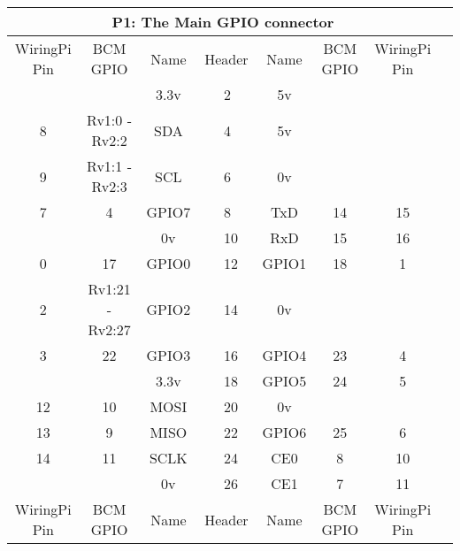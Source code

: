 \documentclass[12pt,a4paper]{article}
\begin{document}
\begin{sffamily}
\begin{center}
\begin{tabular}{|c|c|c||p{8mm}|p{8mm}||c|c|c|c|}
\hline
\multicolumn{8}{|c|}{\bfseries{P1: The Main GPIO connector}}\\
\hline
\hline
WiringPi Pin	& BCM GPIO	& Name	& \multicolumn{2}{|c||}{Header}	& Name	& BCM GPIO	& WiringPi Pin\\
\hline
\hline
	& 			& \textcolor{rtb-red}{3.3v}	& \raggedleft{1} &  2 & \textcolor{rtb-maroon}{5v}	& 	& \\
\hline
8	& Rv1:0 - Rv2:2		& \textcolor{rtb-aqua}{SDA}	& \raggedleft{3} &  4 & \textcolor{rtb-maroon}{5v}	& 	& \\
\hline
9	& Rv1:1 - Rv2:3		& \textcolor{rtb-aqua}{SCL}	& \raggedleft{5} &  6 & \textcolor{rtb-black}{0v}	& 	& \\
\hline
7	& 4			& \textcolor{rtb-green}{GPIO7}	& \raggedleft{7} &  8 & \textcolor{rtb-yellow}{TxD}	& 14    & 15\\
\hline
	& 			& \textcolor{rtb-black}{0v}	& \raggedleft{9} & 10 & \textcolor{rtb-yellow}{RxD}	& 15	& 16\\
\hline
0	& 17			& \textcolor{rtb-green}{GPIO0}	& \raggedleft{11} & 12 & \textcolor{rtb-green}{GPIO1}	& 18	& 1\\
\hline
2	& Rv1:21 - Rv2:27	& \textcolor{rtb-green}{GPIO2}	& \raggedleft{13} & 14 & \textcolor{rtb-black}{0v}	& 	& \\
\hline
3	& 22			& \textcolor{rtb-green}{GPIO3}	& \raggedleft{15} & 16 & \textcolor{rtb-green}{GPIO4}	& 23	& 4\\
\hline
	& 			& \textcolor{rtb-red}{3.3v}	& \raggedleft{17} & 18 & \textcolor{rtb-green}{GPIO5}	& 24	& 5\\
\hline
12	& 10			& \textcolor{rtb-teal}{MOSI}	& \raggedleft{19} & 20 & \textcolor{rtb-black}{0v}	& 	& \\
\hline
13	& 9			& \textcolor{rtb-teal}{MISO}	& \raggedleft{21} & 22 & \textcolor{rtb-green}{GPIO6}	& 25	& 6\\
\hline
14	& 11			& \textcolor{rtb-teal}{SCLK}	& \raggedleft{23} & 24 & \textcolor{rtb-teal}{CE0}	& 8	& 10\\
\hline
	& 			& \textcolor{rtb-black}{0v}	& \raggedleft{25} & 26 & \textcolor{rtb-teal}{CE1}	& 7	& 11\\
\hline
\hline
WiringPi Pin	& BCM GPIO	& Name	& \multicolumn{2}{|c||}{Header}	& Name	& BCM GPIO	& WiringPi Pin\\
\hline
\end{tabular}
\end{center}


\end{sffamily}
\end{document}
